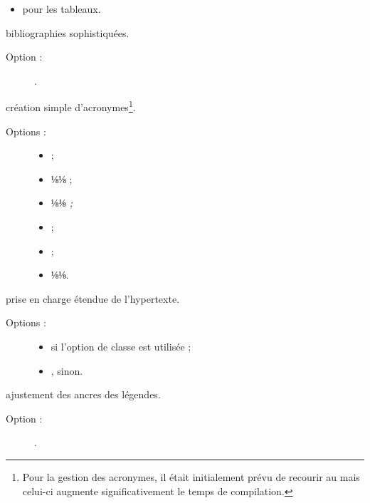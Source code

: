 \documentclass{letgut}
\begin{document}
\begin{ctannews}
\begin{description}
\begin{itemize}
      et  pour les figures ;
    \item {} pour les tableaux.
    \end{itemize}
  \end{description}
\item[biblatex] bibliographies sophistiquées.
  \begin{description}
  \item[Option :] .
  \end{description}
\item[acro] création simple d'acronymes\footnote{Pour la gestion des acronymes,
    il était initialement prévu de recourir au  mais
    celui-ci augmente significativement le temps de compilation.}.
  \begin{description}
  \item[Options :]\leavevmode{}
    \begin{itemize}
    \item {} ;
    \item {}⅛\scshape⅛ ;
    \item {}⅛\em⅛ ;
    \item {} ;
    \item {} ;
    \item {}⅛\upshape⅛.
    \end{itemize}
  \end{description}
\item[hyperref] prise en charge étendue de l'hypertexte.
  \begin{description}
  \item[Options :]\leavevmode{}
    \begin{itemize}
    \item {} si l'option de classe  est utilisée ;
    \item {}, 
      sinon.
    \end{itemize}
  \end{description}
\item[hypcap] ajustement des ancres des légendes.
  \begin{description}
  \item[Option :] .
  \end{description}

\end{ctannews}
\end{document}
